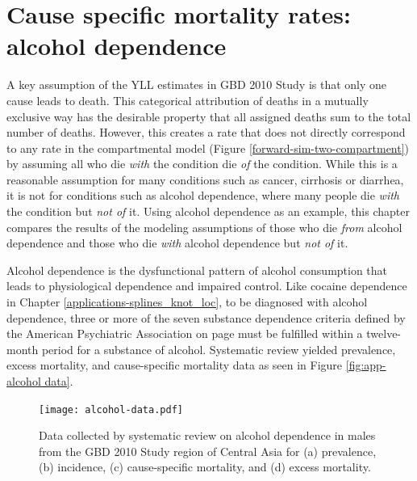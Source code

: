 \chapter{Cause specific mortality rates: alcohol dependence}
\label{applications-csmr}

A key assumption of the YLL estimates in GBD 2010 Study is that only
one cause leads to death.  This categorical attribution of deaths in
a mutually exclusive way has the desirable property that all assigned
deaths sum to the total number of deaths.  However, this
creates a rate that does not directly correspond to any rate in the
compartmental model (Figure \ref{forward-sim-two-compartment}) by
assuming all who die \emph{with} the condition die \emph{of} the
condition.  While this is a reasonable assumption for many conditions
such as cancer, cirrhosis or diarrhea, it is not for conditions such as
alcohol dependence, where many people die \emph{with}
the condition but \emph{not of} it.  Using alcohol dependence as an
example, this chapter compares the results of
the modeling assumptions of those who die \emph{from} alcohol dependence
and those who die \emph{with} alcohol dependence but \emph{not of} it.

Alcohol dependence is the dysfunctional pattern of alcohol consumption
that leads to physiological dependence and impaired control.  Like
cocaine dependence in Chapter \ref{applications-splines_knot_loc}, to
be diagnosed with alcohol dependence, three or more of the seven
substance dependence criteria defined by the American Psychiatric
Association on page \pageref{page:app-substance_dependence} must be
fulfilled within a twelve-month period for a substance of alcohol.
\cite{american_psychiatric_association_diagnostic_2000, hasin_prevalence_2007}
Systematic review yielded prevalence, excess mortality, and
cause-specific mortality data as seen in Figure \ref{fig:app-alcohol
  data}.

    \begin{figure}[h]
        \begin{center}
            \texttt{[image: alcohol-data.pdf]}
            \caption{Data collected by systematic review on alcohol
              dependence in males from the GBD 2010 Study region of
              Central Asia for (a) prevalence, (b) incidence, (c)
              cause-specific mortality, and (d) excess mortality.}
            \label{fig:app-alcohol data}
        \end{center}
    \end{figure}

